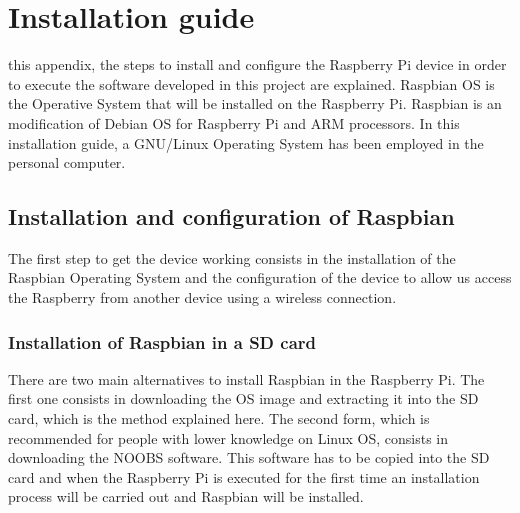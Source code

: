 
\chapter{Installation guide} %
\label{chap:installation_guide}

 this appendix, the steps to install and configure the Raspberry Pi device in order to execute the software developed in this project are explained. Raspbian \ac{OS} \cite{Raspbian} is the Operative System that will be installed on the Raspberry Pi. Raspbian is an modification of Debian \ac{OS} for Raspberry Pi and ARM processors. In this installation guide, a GNU/Linux Operating System has been employed in the personal computer.


\section{Installation and configuration of Raspbian}
The first step to get the device working consists in the installation of the Raspbian Operating System and the configuration of the device to allow us access the Raspberry from another device using a wireless connection.

\subsection{Installation of Raspbian in a SD card}
There are two main alternatives to install Raspbian in the Raspberry Pi. The first one consists in downloading the \ac{OS} image and extracting it into the SD card, which is the method explained here. The second form, which is recommended for people with lower knowledge on Linux \ac{OS}, consists in downloading the NOOBS software. This software has to be copied into the SD card and when the Raspberry Pi is executed for the first time an installation process will be carried out and Raspbian will be installed. 

